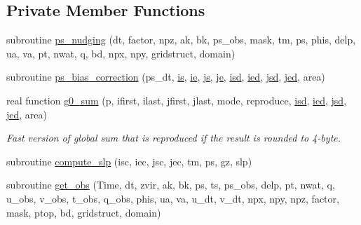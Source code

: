 \subsection*{Private Member Functions}
\begin{DoxyCompactItemize}
\item 
subroutine \hyperlink{classfv__nwp__nudge__mod_a562105a5fef2fdc16f81503979ed73b6}{ps\-\_\-nudging} (dt, factor, npz, ak, bk, ps\-\_\-obs, mask, tm, ps, phis, delp, ua, va, pt, nwat, q, bd, npx, npy, gridstruct, domain)
\item 
subroutine \hyperlink{classfv__nwp__nudge__mod_a77e9f8e082ec5d2ec81019aaf530f256}{ps\-\_\-bias\-\_\-correction} (ps\-\_\-dt, \hyperlink{classfv__nwp__nudge__mod_a635b34cbb0a0b285d6febfa4646c6993}{is}, \hyperlink{classfv__nwp__nudge__mod_a11b27e9ca5d61dc084748127098af2fb}{ie}, \hyperlink{classfv__nwp__nudge__mod_ad9f936f9336b43e00bcc6fa4fd1d4f6a}{js}, \hyperlink{classfv__nwp__nudge__mod_aec115c5d43df5f25250c9a3cd359f177}{je}, \hyperlink{classfv__nwp__nudge__mod_a7d1486af2ea75f210ba0c7d08952fe68}{isd}, \hyperlink{classfv__nwp__nudge__mod_a49d07573330869c0885c65c2ef35d8f4}{ied}, \hyperlink{classfv__nwp__nudge__mod_a14a29353676e857e25063a675a4700d8}{jsd}, \hyperlink{classfv__nwp__nudge__mod_a6354a59117d0add11183736f6f9c055a}{jed}, area)
\item 
real function \hyperlink{classfv__nwp__nudge__mod_a87499eb339d6900e68d8cb5c78c91ef2}{g0\-\_\-sum} (p, ifirst, ilast, jfirst, jlast, mode, reproduce, \hyperlink{classfv__nwp__nudge__mod_a7d1486af2ea75f210ba0c7d08952fe68}{isd}, \hyperlink{classfv__nwp__nudge__mod_a49d07573330869c0885c65c2ef35d8f4}{ied}, \hyperlink{classfv__nwp__nudge__mod_a14a29353676e857e25063a675a4700d8}{jsd}, \hyperlink{classfv__nwp__nudge__mod_a6354a59117d0add11183736f6f9c055a}{jed}, area)
\begin{DoxyCompactList}\small\item\em Fast version of global sum that is reproduced if the result is rounded to 4-\/byte. \end{DoxyCompactList}\item 
subroutine \hyperlink{classfv__nwp__nudge__mod_a1b057b57be7d6e7fad3bf2b54615e84d}{compute\-\_\-slp} (isc, iec, jsc, jec, tm, ps, gz, slp)
\item 
subroutine \hyperlink{classfv__nwp__nudge__mod_ad4f57cb75a42402e0aa82812192b504f}{get\-\_\-obs} (Time, dt, zvir, ak, bk, ps, ts, ps\-\_\-obs, delp, pt, nwat, q, u\-\_\-obs, v\-\_\-obs, t\-\_\-obs, q\-\_\-obs, phis, ua, va, u\-\_\-dt, v\-\_\-dt, npx, npy, npz, factor, mask, ptop, bd, gridstruct, domain)

\end{DoxyCompactItemize}
